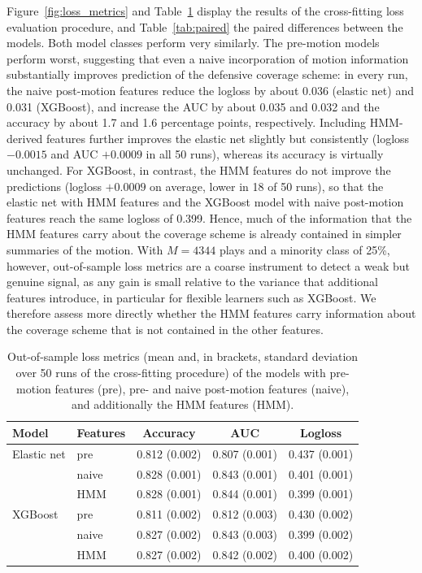 \documentclass[namedate,webpdf,modern,medium]{oup-authoring-template}
\begin{document}

Figure~\ref{fig:loss_metrics} and Table~\ref{tab:perf} display the results of the cross-fitting loss evaluation procedure, and Table~\ref{tab:paired} the paired differences between the models. Both model classes perform very similarly. The pre-motion models perform worst, suggesting that even a naive incorporation of motion information substantially improves prediction of the defensive coverage scheme: in every run, the naive post-motion features reduce the logloss by about 0.036 (elastic net) and 0.031 (XGBoost), and increase the AUC by about 0.035 and 0.032 and the accuracy by about 1.7 and 1.6 percentage points, respectively. Including HMM-derived features further improves the elastic net slightly but consistently (logloss $-0.0015$ and AUC $+0.0009$ in all 50 runs), whereas its accuracy is virtually unchanged. For XGBoost, in contrast, the HMM features do not improve the predictions (logloss $+0.0009$ on average, lower in 18 of 50 runs), so that the elastic net with HMM features and the XGBoost model with naive post-motion features reach the same logloss of 0.399. Hence, much of the information that the HMM features carry about the coverage scheme is already contained in simpler summaries of the motion. With $M = 4344$ plays and a minority class of 25\%, however, out-of-sample loss metrics are a coarse instrument to detect a weak but genuine signal, as any gain is small relative to the variance that additional features introduce, in particular for flexible learners such as XGBoost. We therefore assess more directly whether the HMM features carry information about the coverage scheme that is not contained in the other features.

\begin{table}[t!]
\centering
\caption{Out-of-sample loss metrics (mean and, in brackets, standard deviation over 50 runs of the cross-fitting procedure) of the models with pre-motion features (pre), pre- and naive post-motion features (naive), and additionally the HMM features (HMM).}
\label{tab:perf}
\begin{tabular}{llccc}
\hline
Model & Features & Accuracy & AUC & Logloss \\
\hline
Elastic net & pre & 0.812 (0.002) & 0.807 (0.001) & 0.437 (0.001) \\
 & naive & 0.828 (0.001) & 0.843 (0.001) & 0.401 (0.001) \\
 & HMM & 0.828 (0.001) & 0.844 (0.001) & 0.399 (0.001) \\
XGBoost & pre & 0.811 (0.002) & 0.812 (0.003) & 0.430 (0.002) \\
 & naive & 0.827 (0.002) & 0.843 (0.003) & 0.399 (0.002) \\
 & HMM & 0.827 (0.002) & 0.842 (0.002) & 0.400 (0.002) \\
\hline
\end{tabular}
\end{table}
\end{document}
